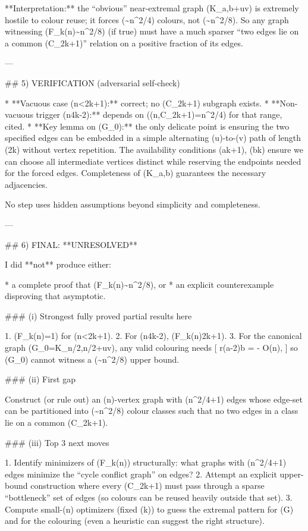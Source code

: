 **Interpretation:** the “obvious” near-extremal graph (K_{a,b}+uv) is extremely hostile to colour reuse; it forces (\sim n^2/4) colours, not (\sim n^2/8). So any graph witnessing (F_k(n)\sim n^2/8) (if true) must have a much sparser “two edges lie on a common (C_{2k+1})” relation on a positive fraction of its edges.

---

## 5) VERIFICATION (adversarial self-check)

* **Vacuous case (n<2k+1):** correct; no (C_{2k+1}) subgraph exists.
* **Non-vacuous trigger (n\ge 4k-2):** depends on ((n,C_{2k+1})=\lfloor n^2/4\rfloor) for that range, cited.
* **Key lemma on (G_0):** the only delicate point is ensuring the two specified edges can be embedded in a simple alternating (u)-to-(v) path of length (2k) without vertex repetition. The availability conditions (a\ge k+1), (b\ge k) ensure we can choose all intermediate vertices distinct while reserving the endpoints needed for the forced edges. Completeness of (K_{a,b}) guarantees the necessary adjacencies.

No step uses hidden assumptions beyond simplicity and completeness.

---

## 6) FINAL: **UNRESOLVED**

I did **not** produce either:

* a complete proof that (F_k(n)\sim n^2/8), or
* an explicit counterexample disproving that asymptotic.

### (i) Strongest fully proved partial results here

1. (F_k(n)=1) for (n<2k+1).
2. For (n\ge 4k-2), (F_k(n)\ge 2k+1).
3. For the canonical graph (G_0=K_{\lfloor n/2\rfloor,\lceil n/2\rceil}+uv), any valid colouring needs
   [
   r\ge (a-2)b = \left\lfloor{}\right\rfloor - O(n),
   ]
   so (G_0) cannot witness a (\sim n^2/8) upper bound.

### (ii) First gap

Construct (or rule out) an (n)-vertex graph with (\lfloor n^2/4\rfloor+1) edges whose edge-set can be partitioned into (\sim n^2/8) colour classes such that no two edges in a class lie on a common (C_{2k+1}).

### (iii) Top 3 next moves

1. Identify minimizers of (F_k(n)) structurally: what graphs with (\lfloor n^2/4\rfloor+1) edges minimize the “cycle conflict graph” on edges?
2. Attempt an explicit upper-bound construction where every (C_{2k+1}) must pass through a sparse “bottleneck” set of edges (so colours can be reused heavily outside that set).
3. Compute small-(n) optimizers (fixed (k)) to guess the extremal pattern for (G) and for the colouring (even a heuristic can suggest the right structure).

